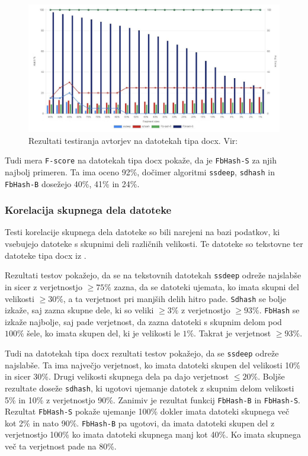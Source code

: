 \documentclass{acm_proc_article-sp}
\begin{document}
\begin{figure}[htb]
\begin{center}
\includegraphics[width=1\columnwidth]{frag_det_docx.png}
\end{center}
\caption{\small{Rezultati testiranja avtorjev na datotekah tipa docx. Vir: \cite{fbhash}}}
\label{fig:fd-docx-rez}
\end{figure}

Tudi mera \texttt{F-score} na datotekah tipa docx pokaže, da je \texttt{FbHash-S} za njih najbolj primeren. Ta ima oceno 92\%, dočimer algoritmi \texttt{ssdeep}, \texttt{sdhash} in \texttt{FbHash-B} dosežejo 40\%, 41\% in 24\%.

\subsubsection{Korelacija skupnega dela datoteke}

Testi korelacije skupnega dela datoteke so bili narejeni na bazi podatkov, ki vsebujejo datoteke s skupnimi deli različnih velikosti. Te datoteke so tekstovne ter datoteke tipa docx iz \cite{dataset}. 

Rezultati testov pokažejo, da se na tekstovnih datotekah \texttt{ssdeep} odreže najslabše in sicer z verjetnostjo $\geq 75\%$ zazna, da se datoteki ujemata, ko imata skupni del velikosti $\geq 30\%$, a ta verjetnost pri manjših delih hitro pade. \texttt{Sdhash} se bolje izkaže, saj zazna skupne dele, ki so veliki $\geq 3\%$ z verjetnostjo $\geq 93\%$. \texttt{FbHash} se izkaže najbolje, saj pade verjetnost, da zazna datoteki s skupnim delom pod $100\%$ šele, ko imata skupen del, ki je velikosti le $1\%$. Takrat je verjetnost $\geq 93\%$.

Tudi na datotekah tipa docx rezultati testov pokažejo, da se \texttt{ssdeep} odreže najslabše. Ta ima največjo verjetnost, ko imata datoteki skupen del velikosti 10\% in sicer 30\%. Drugi velikosti skupnega dela pa dajo verjetnost $\leq 20\%$. Boljše rezultate doseže \texttt{sdhash}, ki ugotovi ujemanje datotek z skupnim delom velikosti 5\% in 10\% z verjetnostjo 90\%. Zanimiv je rezultat funkcij \texttt{FbHash-B} in \texttt{FbHash-S}. Rezultat \texttt{FbHash-S} pokaže ujemanje 100\% dokler imata datoteki skupnega več kot 2\% in nato 90\%. \texttt{FbHash-B} pa ugotovi, da imata datoteki skupen del z verjetnostjo 100\% ko imata datoteki skupnega manj kot 40\%. Ko imata skupnega več ta verjetnost pade na 80\%.
\end{document}
